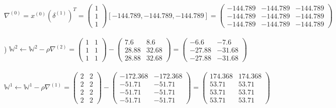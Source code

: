 \documentclass[12pt]{article}
\begin{document}
\indent $\nabla^{(0)} = x^{(0)}(\delta^{(1)})^T = 
\begin{pmatrix}
1\\ 1\\ 1
\end{pmatrix}
[-144.789, -144.789, -144.789] = 
\begin{pmatrix}
-144.789 & -144.789 & -144.789 \\
-144.789 & -144.789 & -144.789 \\
-144.789 & -144.789 & -144.789 
\end{pmatrix}
$\\



\noindent \hrulefill \\



) $\mathbb{W}^{2} \leftarrow \mathbb{W}^{2} - \rho\nabla^{(2)} = 
\begin{pmatrix}
1 & 1 \\
1 & 1 \\
1 & 1 
\end{pmatrix} - 
\begin{pmatrix}
7.6 & 8.6 \\
28.88 & 32.68 \\
28.88 & 32.68
\end{pmatrix} = 
\begin{pmatrix}
-6.6 & -7.6 \\
-27.88 & -31.68 \\
-27.88 & -31.68
\end{pmatrix}
$\\\\

\indent $\mathbb{W}^{1} \leftarrow \mathbb{W}^{1} - \rho\nabla^{(1)} = 
\begin{pmatrix}
2 & 2 \\
2 & 2 \\
2 & 2 \\
2 & 2 
\end{pmatrix} - 
\begin{pmatrix}
-172.368 & -172.368 \\
-51.71 & -51.71 \\
-51.71 & -51.71 \\
-51.71 & -51.71 
\end{pmatrix} = 
\begin{pmatrix}
174.368 & 174.368 \\
53.71 & 53.71 \\
53.71 & 53.71 \\
53.71 & 53.71 
\end{pmatrix}
$\\\\
\end{document}

